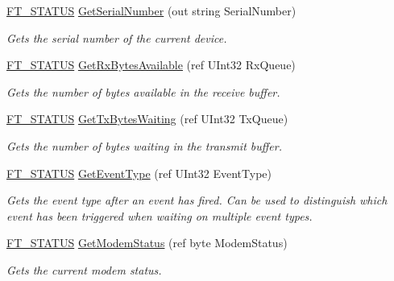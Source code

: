 \begin{DoxyCompactItemize}
\mbox{\hyperlink{class_f_t_d2_x_x___n_e_t_1_1_f_t_d_i_aabe20ad905cc4ccc1e35dd5b877d9a83}{F\+T\+\_\+\+S\+T\+A\+T\+US}} \mbox{\hyperlink{class_f_t_d2_x_x___n_e_t_1_1_f_t_d_i_a38dfb1736759adfbed4e5d536bf73041}{Get\+Serial\+Number}} (out string Serial\+Number)
\begin{DoxyCompactList}\small\item\em Gets the serial number of the current device. \end{DoxyCompactList}\item 
\mbox{\hyperlink{class_f_t_d2_x_x___n_e_t_1_1_f_t_d_i_aabe20ad905cc4ccc1e35dd5b877d9a83}{F\+T\+\_\+\+S\+T\+A\+T\+US}} \mbox{\hyperlink{class_f_t_d2_x_x___n_e_t_1_1_f_t_d_i_a5539d6cb1f768374a67294758b346f45}{Get\+Rx\+Bytes\+Available}} (ref U\+Int32 Rx\+Queue)
\begin{DoxyCompactList}\small\item\em Gets the number of bytes available in the receive buffer. \end{DoxyCompactList}\item 
\mbox{\hyperlink{class_f_t_d2_x_x___n_e_t_1_1_f_t_d_i_aabe20ad905cc4ccc1e35dd5b877d9a83}{F\+T\+\_\+\+S\+T\+A\+T\+US}} \mbox{\hyperlink{class_f_t_d2_x_x___n_e_t_1_1_f_t_d_i_aa16dd3f9a92e1f82db5ffe55bd9cb0e3}{Get\+Tx\+Bytes\+Waiting}} (ref U\+Int32 Tx\+Queue)
\begin{DoxyCompactList}\small\item\em Gets the number of bytes waiting in the transmit buffer. \end{DoxyCompactList}\item 
\mbox{\hyperlink{class_f_t_d2_x_x___n_e_t_1_1_f_t_d_i_aabe20ad905cc4ccc1e35dd5b877d9a83}{F\+T\+\_\+\+S\+T\+A\+T\+US}} \mbox{\hyperlink{class_f_t_d2_x_x___n_e_t_1_1_f_t_d_i_a140b361e7379ab93e5ae6bc86c318fdd}{Get\+Event\+Type}} (ref U\+Int32 Event\+Type)
\begin{DoxyCompactList}\small\item\em Gets the event type after an event has fired. Can be used to distinguish which event has been triggered when waiting on multiple event types. \end{DoxyCompactList}\item 
\mbox{\hyperlink{class_f_t_d2_x_x___n_e_t_1_1_f_t_d_i_aabe20ad905cc4ccc1e35dd5b877d9a83}{F\+T\+\_\+\+S\+T\+A\+T\+US}} \mbox{\hyperlink{class_f_t_d2_x_x___n_e_t_1_1_f_t_d_i_a3315357eee0468a2a74ad35dc28c8211}{Get\+Modem\+Status}} (ref byte Modem\+Status)
\begin{DoxyCompactList}\small\item\em Gets the current modem status. \end{DoxyCompactList}\item 

\end{DoxyCompactItemize}

